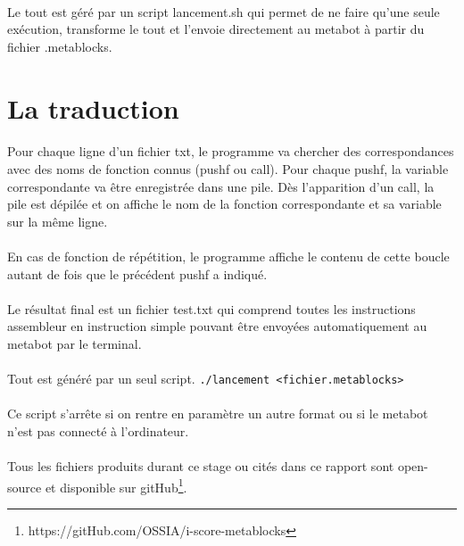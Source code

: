 \documentclass[10pt,a4paper]{report}
\begin{document}
\paragraph{}
Le tout est géré par un script lancement.sh qui permet de ne faire qu'une seule exécution, transforme le tout et l'envoie directement au metabot à partir du fichier .metablocks.

\paragraph{}
\section{La traduction}
\paragraph{}
Pour chaque ligne d'un fichier txt, le programme va chercher des correspondances avec des noms de fonction connus (pushf ou call). Pour chaque pushf, la variable correspondante va être enregistrée dans une pile. Dès l'apparition d'un call, la pile est dépilée et on affiche le nom de la fonction correspondante et sa variable sur la même ligne.
\paragraph{}
En cas de fonction de répétition, le programme affiche le contenu de cette boucle autant de fois que le précédent pushf a indiqué.
\paragraph{}
Le résultat final est un fichier test.txt qui comprend toutes les instructions assembleur en instruction simple pouvant être envoyées automatiquement au metabot par le terminal.
\paragraph{}
Tout est généré par un seul script.
\texttt{./lancement <fichier.metablocks>}
\paragraph{}
Ce script s'arrête si on rentre en paramètre un autre format ou si le metabot n'est pas connecté à l'ordinateur.
\paragraph{}
Tous les fichiers produits durant ce stage ou cités dans ce rapport sont open-source et disponible sur  gitHub\footnote{https://gitHub.com/OSSIA/i-score-metablocks}.
\end{document}
